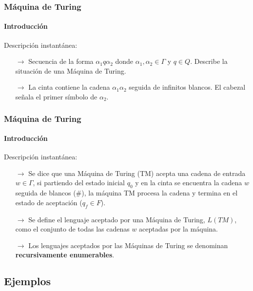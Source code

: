\documentclass{beamer}
\begin{document}
        \begin{frame}
            \frametitle{M\'aquina de Turing}
            \framesubtitle{Introducci\'on}

			\begin{block}{Descripci\'on instant\'anea:}
			    \begin{itemize}
                    \item[$\rightarrow$] Secuencia de la forma $\alpha_{1}q\alpha_{2}$ donde $\alpha_{1},\alpha_{2} \in \Gamma$ y $q \in Q$. Describe la situaci\'on de una M\'aquina de Turing.
                    \item[$\rightarrow$] La cinta contiene la cadena $\alpha_{1}\alpha_{2}$ seguida de infinitos blancos. El cabezal se\~nala el primer s\'imbolo de $\alpha_{2}$.
                \end{itemize}
			\end{block}
		\end{frame}

        \begin{frame}
            \frametitle{M\'aquina de Turing}
            \framesubtitle{Introducci\'on}

			\begin{block}{Descripci\'on instant\'anea:}
			    \begin{itemize}
                    \item[$\rightarrow$] Se dice que una M\'aquina de Turing (TM) acepta una cadena de entrada $w \in \Gamma$, si partiendo del estado inicial $q_{0}$ y en la cinta se encuentra la cadena $w$ seguida de blancos (\#), la m\'aquina TM procesa la cadena y termina en el estado de aceptaci\'on ($q_{f} \in F$).
                    \item[$\rightarrow$] Se define el lenguaje aceptado por una M\'aquina de Turing, $L(TM)$, como el conjunto de todas las cadenas $w$ aceptadas por la m\'aquina.
                    \item[$\rightarrow$] Los lenguajes aceptados por las M\'aquinas de Turing se denominan \textbf{recursivamente enumerables}.
                \end{itemize}
			\end{block}
		\end{frame}

        \subsection{Ejemplos}
\end{document}
